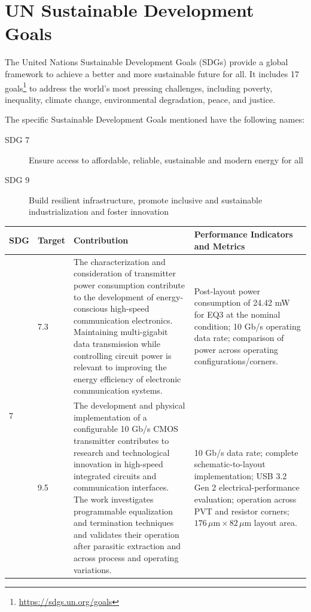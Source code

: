 
\chapter*{UN Sustainable Development Goals} \label{chap:UnitedNations}

The United Nations Sustainable Development Goals (SDGs) provide a global framework to achieve a better and more sustainable future for all. 
It includes 17 goals\footnote{\url{https://sdgs.un.org/goals}} to address the world's most pressing challenges, including poverty, inequality, climate change, environmental degradation, peace, and justice. 

The specific Sustainable Development Goals mentioned have the following names:

\begin{description}
\item [SDG 7]
Ensure access to affordable, reliable, sustainable and modern energy for all
\item [SDG 9]
Build resilient infrastructure, promote inclusive and sustainable industrialization and foster innovation
\end{description}

\begin{center}
\begin{tabular}{|l|l|p{58mm}|p{52mm}|}
\hline
\textbf{SDG} & \textbf{Target} & \textbf{Contribution} & \textbf{Performance Indicators and Metrics} \\ 
\hline
\hline
    \multirow{3}{*}{7} & 7.3 & The characterization and consideration of transmitter power consumption contribute to the development of energy-conscious high-speed communication electronics. Maintaining multi-gigabit data transmission while controlling circuit power is relevant to improving the energy efficiency of electronic communication systems. & Post-layout power consumption of 24.42 mW for EQ3 at the nominal condition; 10 Gb/s operating data rate; comparison of power across operating configurations/corners. \\
\hline
    \multirow{2}{*}{9} & 9.5 & The development and physical implementation of a configurable 10 Gb/s CMOS transmitter contributes to research and technological innovation in high-speed integrated circuits and communication interfaces. The work investigates programmable equalization and termination techniques and validates their operation after parasitic extraction and across process and operating variations. & 10 Gb/s data rate; complete schematic-to-layout implementation; USB 3.2 Gen 2 electrical-performance evaluation; operation across PVT and resistor corners; \(176\,\mu\mathrm{m}\times82\,\mu\mathrm{m}\) layout area. \\
\hline
\end{tabular}
\end{center}

